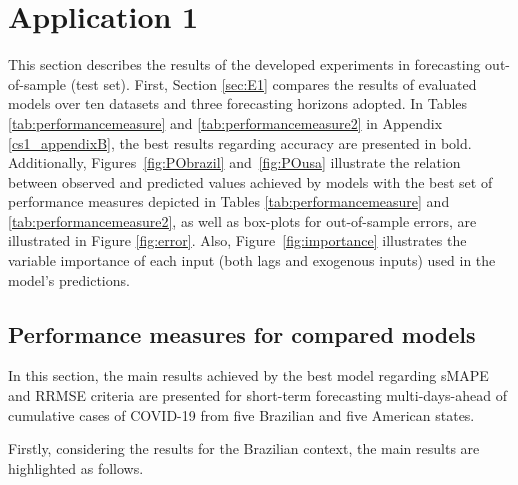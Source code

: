 \section{Application 1} \label{sec:case_study1}

This section describes the results of the developed experiments in forecasting out-of-sample (test set). First, Section \ref{sec:E1} compares the results of evaluated models over ten datasets and three forecasting horizons adopted. In Tables \ref{tab:performancemeasure} and \ref{tab:performancemeasure2} in Appendix \ref{cs1_appendixB}, the best results regarding accuracy are presented in bold. Additionally, Figures~\ref{fig:PObrazil} and~\ref{fig:POusa} illustrate the relation between observed and predicted values achieved by models with the best set of performance measures depicted in Tables \ref{tab:performancemeasure} and \ref{tab:performancemeasure2}, as well as box-plots for out-of-sample errors, are illustrated in Figure \ref{fig:error}. Also, Figure~\ref{fig:importance} illustrates the variable importance of each input (both lags and exogenous inputs) used in the model's predictions.

\subsection{Performance measures for compared models \label{sec:E1}}

In this section, the main results achieved by the best model regarding \ac{sMAPE} and \ac{RRMSE} criteria are presented for short-term forecasting multi-days-ahead of cumulative cases of \ac{COVID-19} from five Brazilian and five American states. 

Firstly, considering the results for the Brazilian context, the main results are highlighted as follows.

